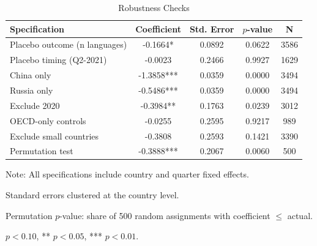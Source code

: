 \begin{table}[htbp]
\centering
\caption{Robustness Checks}
\label{tab:robustness}
\begin{tabular}{lcccc}
\toprule
Specification & Coefficient & Std. Error & $p$-value & N \\
\midrule
Placebo outcome (n languages) & -0.1664* & 0.0892 & 0.0622 & 3586 \\
Placebo timing (Q2-2021) & -0.0023 & 0.2466 & 0.9927 & 1629 \\
China only & -1.3858*** & 0.0359 & 0.0000 & 3494 \\
Russia only & -0.5486*** & 0.0359 & 0.0000 & 3494 \\
Exclude 2020 & -0.3984** & 0.1763 & 0.0239 & 3012 \\
OECD-only controls & -0.0255 & 0.2595 & 0.9217 & 989 \\
Exclude small countries & -0.3808 & 0.2593 & 0.1421 & 3390 \\
Permutation test & -0.3888*** & 0.2067 & 0.0060 & 500 \\
\bottomrule
\end{tabular}
\begin{tablenotes}
\small
\item Note: All specifications include country and quarter fixed effects.
\item Standard errors clustered at the country level.
\item Permutation $p$-value: share of 500 random assignments with coefficient $\leq$ actual.
\item * $p<0.10$, ** $p<0.05$, *** $p<0.01$.
\end{tablenotes}
\end{table}